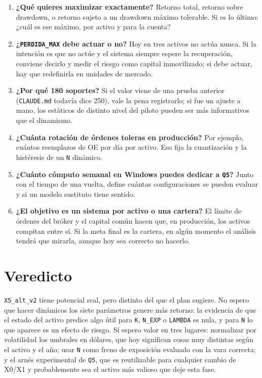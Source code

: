\documentclass[11pt,a4paper]{article}
\newcommand{\code}[1]{\texttt{\small #1}}
\begin{document}
\begin{enumerate}[leftmargin=1.4em]
  \item \textbf{¿Qué quieres maximizar exactamente?} Retorno total, retorno sobre drawdown, o retorno
        sujeto a un drawdown máximo tolerable. Si es lo último: ¿cuál es ese máximo, por activo y para la
        cuenta?
  \item \textbf{¿\code{PERDIDA\_MAX} debe actuar o no?} Hoy en tres activos no actúa nunca. Si la
        intención es que no actúe y el sistema siempre espere la recuperación, conviene decirlo y medir el
        riesgo como capital inmovilizado; si debe actuar, hay que redefinirla en unidades de mercado.
  \item \textbf{¿Por qué 180 soportes?} Si el valor viene de una prueba anterior (\code{CLAUDE.md}
        todavía dice 250), vale la pena registrarlo; si fue un ajuste a mano, los estáticos de distinto
        nivel del piloto pueden ser más informativos que el dinamismo.
  \item \textbf{¿Cuánta rotación de órdenes toleras en producción?} Por ejemplo, cuántos reemplazos de
        OE por día por activo. Eso fija la cuantización y la histéresis de un \code{N} dinámico.
  \item \textbf{¿Cuánto cómputo semanal en Windows puedes dedicar a \code{Q5}?} Junto con el tiempo de
        una vuelta, define cuántas configuraciones se pueden evaluar y si un modelo sustituto tiene sentido.
  \item \textbf{¿El objetivo es un sistema por activo o una cartera?} El límite de órdenes del bróker y el
        capital común hacen que, en producción, los activos compitan entre sí. Si la meta final es la
        cartera, en algún momento el análisis tendrá que mirarla, aunque hoy sea correcto no hacerlo.
\end{enumerate}

\section{Veredicto}

\code{X5\_alt\_v2} tiene potencial real, pero distinto del que el plan sugiere. No espero que hacer
dinámicos los siete parámetros genere más retorno: la evidencia de que el estado del activo predice algo
útil para \code{K}, \code{N\_EXP} o \code{LAMBDA} es nula, y para \code{N} lo que aparece es un efecto de
riesgo. Sí espero valor en tres lugares: normalizar por volatilidad los umbrales en dólares, que hoy
significan cosas muy distintas según el activo y el año; usar \code{N} como freno de exposición evaluado
con la vara correcta; y el arnés experimental de \code{Q5}, que es reutilizable para cualquier cambio de
X0/X1 y probablemente sea el activo más valioso que deje esta fase.
\end{document}
